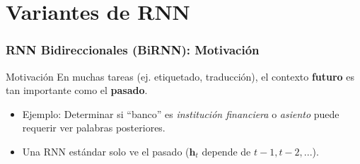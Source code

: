 \documentclass[handout]{beamer}
\newcommand{\vect}[1]{\mathbf{#1}} %
\begin{document}
\section{Variantes de RNN}

\begin{frame}
    \frametitle{RNN Bidireccionales (BiRNN): Motivación}
     \begin{block}{Motivación}
        En muchas tareas (ej. etiquetado, traducción), el contexto \textbf{futuro} es tan importante como el \textbf{pasado}.
        \begin{itemize}
            \item Ejemplo: Determinar si ``banco'' es \textit{institución financiera} o \textit{asiento} puede requerir ver palabras posteriores.
            \item Una RNN estándar solo ve el pasado ($\vect{h}_t$ depende de $t-1, t-2, ...$).
        \end{itemize}
    \end{block}
\end{frame}
\end{document}

